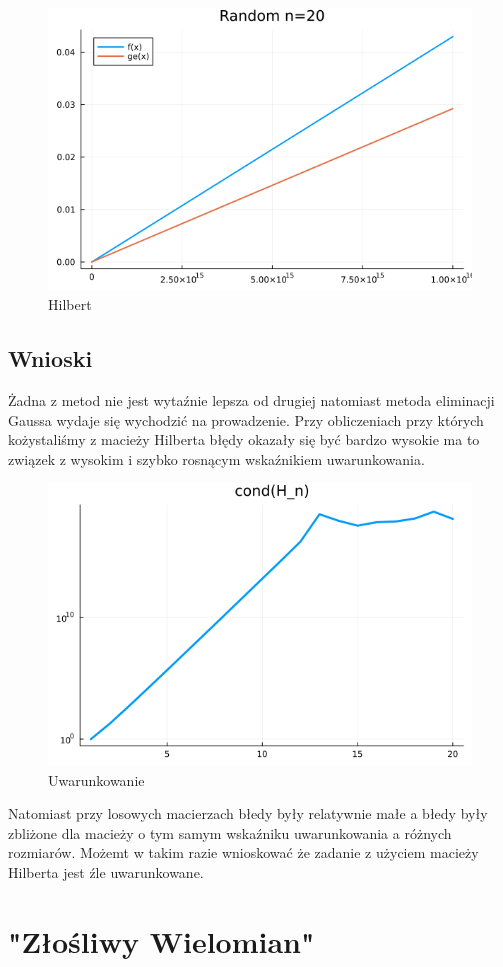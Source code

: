 \documentclass{article}
\begin{document}
    \begin{figure}[H]
        \centering
        \includegraphics[width=0.75\linewidth]{3.4.png}
        \caption{Hilbert}
        \label{fig:enter-label}
    \end{figure}
    \subsection{Wnioski}
        Żadna z metod nie jest wytaźnie lepsza od drugiej natomiast metoda eliminacji Gaussa wydaje się wychodzić na prowadzenie. Przy obliczeniach przy których kożystaliśmy z macieży Hilberta błędy okazały się być bardzo wysokie ma to związek z wysokim i szybko rosnącym wskaźnikiem uwarunkowania.
        \begin{figure}[H]
            \centering
            \includegraphics[width=0.75\linewidth]{3.5.png}
            \caption{Uwarunkowanie}
            \label{fig:enter-label}
        \end{figure}
        Natomiast przy losowych macierzach błedy były relatywnie małe a błedy były zbliżone dla macieży o tym samym wskaźniku uwarunkowania a różnych rozmiarów. Możemt w takim razie wnioskować że zadanie z użyciem macieży Hilberta jest źle uwarunkowane.
\section{"Złośliwy Wielomian"}
\end{document}

